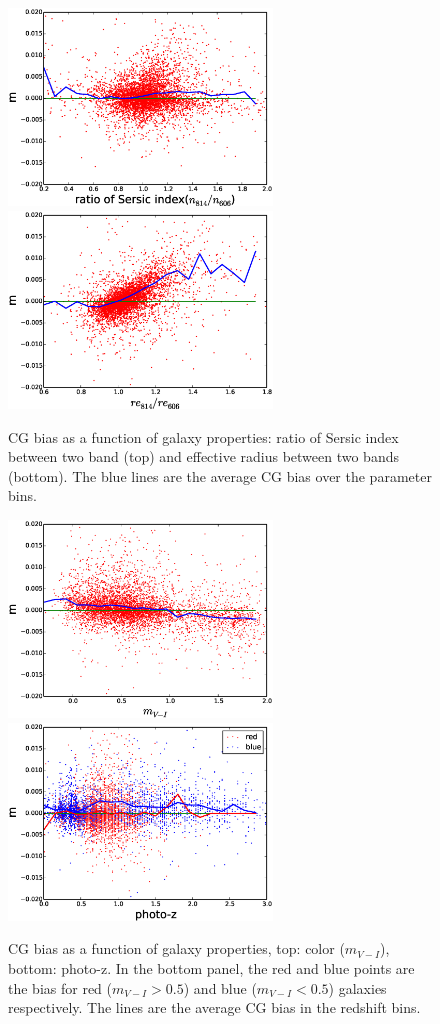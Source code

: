 \documentclass[useAMS,usenatbib]{mn2e}
\begin{document}
\begin{figure}
\includegraphics[width=7.0cm]{zcgb-ne16.eps}
\includegraphics[width=7.0cm]{zcgb-re16.eps}
\caption{CG bias as a function of galaxy properties: ratio of Sersic
  index between two band (top) and effective radius between two bands
  (bottom). The blue lines are the average CG bias over the parameter
  bins.}
\label{fig:cg2fitpar}
\end{figure}
%
\begin{figure}
\includegraphics[width=7.0cm]{zcolor16.eps}
\includegraphics[width=7.0cm]{zphotoz16.eps}
\caption{CG bias as a function of galaxy properties, top: color
  ($m_{V-I}$), bottom: photo-z. In the bottom panel, the red and blue
  points are the bias for red ($m_{V-I}>0.5$) and blue ($m_{V-I}<0.5$)
  galaxies respectively. The lines are the average CG bias in the
  redshift bins.}
\label{fig:cg2color}
\end{figure}
\end{document}
